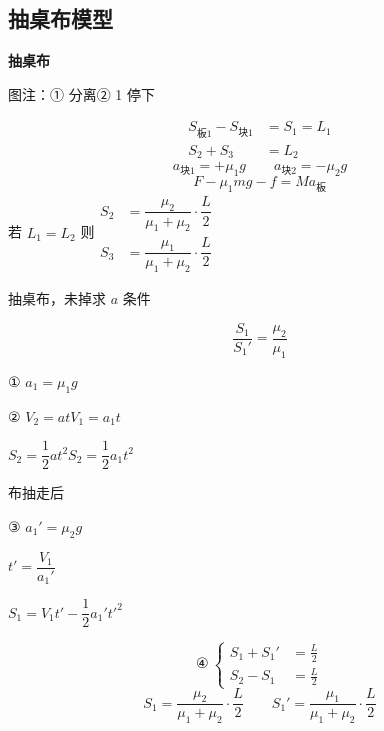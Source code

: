 \subsection{抽桌布模型}
\textbf{抽桌布}

\noindent 图注：① 分离\quad ② 1 停下

\begin{align*}
S_{\text{板}1}-S_{\text{块}1}&=S_1=L_1\\
S_2+S_3&=L_2
\end{align*}
\[
a_{\text{块}1}=+\mu_1g\qquad a_{\text{块}2}=-\mu_2g
\]
\[
F-\mu_1mg-f=Ma_{\text{板}}
\]
\noindent 若 $L_1=L_2$ 则\quad $\begin{aligned}S_2&=\dfrac{\mu_2}{\mu_1+\mu_2}\cdot\dfrac L2\\[4pt] S_3&=\dfrac{\mu_1}{\mu_1+\mu_2}\cdot\dfrac L2\end{aligned}$

\begin{problem}
抽桌布，未掉求 $a$ 条件%

\[
\frac{S_1}{S_1'}=\frac{\mu_2}{\mu_1}
\]
\begin{solution}
\noindent ① $a_1=\mu_1g$

\noindent ② $V_2=at$\qquad $V_1=a_1t$

\noindent\hspace*{2em}$S_2=\dfrac12at^2$\qquad $S_2=\dfrac12a_1t^2$%

\noindent \hspace*{1em}布抽走后

\noindent ③ $a_1'=\mu_2g$

\noindent\hspace*{2em}$t'=\dfrac{V_1}{a_1'}$

\noindent\hspace*{2em}$S_1=V_1t'-\dfrac12a_1't'^2$%

\[
\text{④}\ \left\{\begin{aligned}S_1+S_1'&=\frac L2\\ S_2-S_1&=\frac L2\end{aligned}\right.
\]
\[
S_1=\frac{\mu_2}{\mu_1+\mu_2}\cdot\frac L2\qquad S_1'=\frac{\mu_1}{\mu_1+\mu_2}\cdot\frac L2
\]
\end{solution}
\end{problem}

